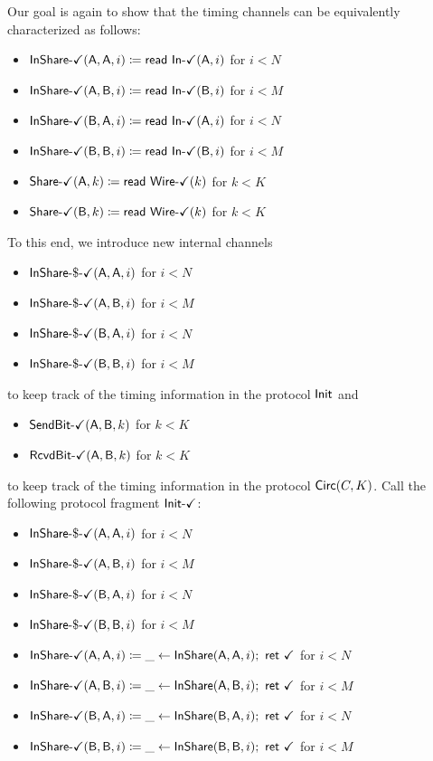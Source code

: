 \noindent Our goal is again to show that the timing channels can be equivalently characterized as follows:
\begin{itemize}
\item {\color{teal} $\InShareOk(\A,\A,i) \coloneqq \read{\InOk(\A,i)}$ for $i < N$}
\item {\color{teal} $\InShareOk(\A,\B,i) \coloneqq \read{\InOk(\B,i)}$ for $i < M$}
\item {\color{teal} $\InShareOk(\B,\A,i) \coloneqq \read{\InOk(\A,i)}$ for $i < N$}
\item {\color{teal} $\InShareOk(\B,\B,i) \coloneqq \read{\InOk(\B,i)}$ for $i < M$}
\item {\color{teal} $\ShareOk(\A,k) \coloneqq \read{\WireOk(k)}$ for $k < K$}
\item {\color{teal} $\ShareOk(\B,k) \coloneqq \read{\WireOk(k)}$ for $k < K$}
\end{itemize}
To this end, we introduce new internal channels
\begin{itemize}
\item {\color{teal} $\InShareGenOk(\A,\A,i)$ for $i < N$}
\item {\color{teal} $\InShareGenOk(\A,\B,i)$ for $i < M$}
\item {\color{teal} $\InShareGenOk(\B,\A,i)$ for $i < N$}
\item {\color{teal} $\InShareGenOk(\B,\B,i)$ for $i < M$}
\end{itemize}
to keep track of the timing information in the protocol $\Init$ and
\begin{itemize}
\item {\color{teal} $\SendBitOk(\A,\B,k)$ for $k < K$}
\item {\color{teal} $\RcvdBitOk(\A,\B,k)$ for $k < K$}
\end{itemize}
to keep track of the timing information in the protocol $\Circ(C,K)$. Call the following protocol fragment $\InitOk$:
\begin{itemize}
\item {\color{teal} $\InShareGenOk(\A,\A,i)$ for $i < N$}
\item {\color{teal} $\InShareGenOk(\A,\B,i)$ for $i < M$}
\item {\color{teal} $\InShareGenOk(\B,\A,i)$ for $i < N$}
\item {\color{teal} $\InShareGenOk(\B,\B,i)$ for $i < M$}
\item {\color{teal} $\InShareOk(\A,\A,i) \coloneqq \_ \leftarrow \InShare(\A,\A,i); \ \ret{\checkmark}$ for $i < N$}
\item {\color{teal} $\InShareOk(\A,\B,i) \coloneqq \_ \leftarrow \InShare(\A,\B,i); \ \ret{\checkmark}$ for $i < M$}
\item {\color{teal} $\InShareOk(\B,\A,i) \coloneqq \_ \leftarrow \InShare(\B,\A,i); \ \ret{\checkmark}$ for $i < N$}
\item {\color{teal} $\InShareOk(\B,\B,i) \coloneqq \_ \leftarrow \InShare(\B,\B,i); \ \ret{\checkmark}$ for $i < M$}
\end{itemize}
